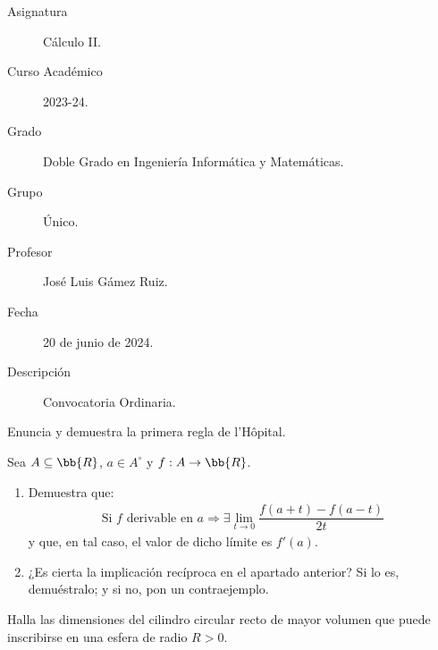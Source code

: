 \documentclass[12pt]{article}
\begin{document}

    
    

    \begin{description}
        \item[Asignatura] Cálculo II.
        \item[Curso Académico] 2023-24.
        \item[Grado] Doble Grado en Ingeniería Informática y Matemáticas.
        \item[Grupo] Único.
        \item[Profesor] José Luis Gámez Ruiz.
        \item[Fecha] 20 de junio de 2024.
        \item[Descripción] Convocatoria Ordinaria.
    \end{description}
    \newpage

    \begin{ejercicio}
        Enuncia y demuestra la primera regla de l'Hôpital.
    \end{ejercicio}

    \begin{ejercicio}
        Sea $A \subseteq \bb{R}$, $a \in A^{\circ}$ y $f:A \rightarrow \bb{R}$.
        
        \begin{enumerate}
            \item Demuestra que:
            \begin{gather*}
                \text{Si $f$ derivable en $a$} \Longrightarrow \exists \lim\limits_{t \to 0} \dfrac{f(a+t)-f(a-t)}{2t}
            \end{gather*}
            y que, en tal caso, el valor de dicho límite es $f'(a)$.

            \item ¿Es cierta la implicación recíproca en el apartado anterior? Si lo es, demuéstralo; y si no, pon un contraejemplo.
        \end{enumerate}
    \end{ejercicio}

    \begin{ejercicio}
        Halla las dimensiones del cilindro circular recto de mayor volumen que puede inscribirse en una esfera de radio $R>0$.
    \end{ejercicio}
\end{document}
